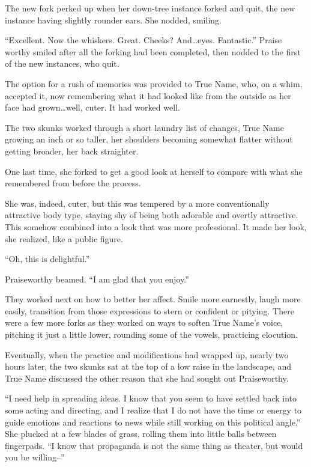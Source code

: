 The new fork perked up when her down-tree instance forked and quit, the new instance having slightly rounder ears. She nodded, smiling.

``Excellent. Now the whiskers. Great. Cheeks? And\ldots eyes. Fantastic.'' Praise worthy smiled after all the forking had been completed, then nodded to the first of the new instances, who quit.

The option for a rush of memories was provided to True Name, who, on a whim, accepted it, now remembering what it had looked like from the outside as her face had grown\ldots well, cuter. It had worked well.

The two skunks worked through a short laundry list of changes, True Name growing an inch or so taller, her shoulders becoming somewhat flatter without getting broader, her back straighter.

One last time, she forked to get a good look at herself to compare with what she remembered from before the process.

She was, indeed, cuter, but this was tempered by a more conventionally attractive body type, staying shy of being both adorable and overtly attractive. This somehow combined into a look that was more professional. It made her look, she realized, like a public figure.

``Oh, this is delightful.''

Praiseworthy beamed. ``I am glad that you enjoy.''

They worked next on how to better her affect. Smile more earnestly, laugh more easily, transition from those expressions to stern or confident or pitying. There were a few more forks as they worked on ways to soften True Name's voice, pitching it just a little lower, rounding some of the vowels, practicing elocution.

Eventually, when the practice and modifications had wrapped up, nearly two hours later, the two skunks sat at the top of a low raise in the landscape, and True Name discussed the other reason that she had sought out Praiseworthy.

``I need help in spreading ideas. I know that you seem to have settled back into some acting and directing, and I realize that I do not have the time or energy to guide emotions and reactions to news while still working on this political angle.'' She plucked at a few blades of grass, rolling them into little balls between fingerpads. ``I know that propaganda is not the same thing as theater, but would you be willing--''

